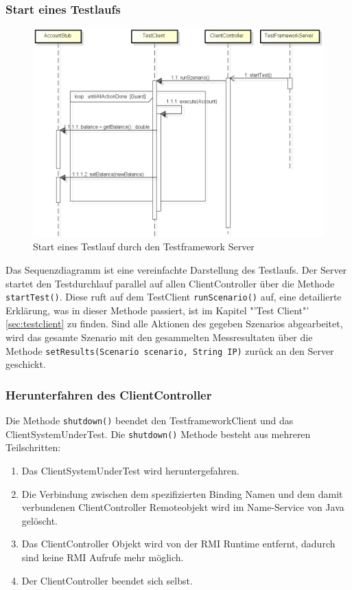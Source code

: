 \subsubsection{Start eines Testlaufs}
\begin{figure}[H]
\begin{center}
\includegraphics[scale=0.55]{image_testFramework/startTest.png}
\end{center}
\caption{Start eines Testlauf durch den Testframework Server}
\end{figure}
Das Sequenzdiagramm ist eine vereinfachte Darstellung des Testlaufs. Der Server startet den Testdurchlauf parallel auf allen ClientController über die Methode \verb+startTest()+. Diese ruft auf dem TestClient \verb+runScenario()+ auf, eine detailierte Erklärung, was in dieser Methode passiert, ist im Kapitel "'Test Client"' \ref{sec:testclient} zu finden. Sind alle Aktionen des gegeben Szenarios abgearbeitet, wird das gesamte Szenario mit den gesammelten Messresultaten über die Methode \verb+setResults(Scenario scenario, String IP)+ zurück an den Server geschickt.

\subsubsection{Herunterfahren des ClientController}
Die Methode \texttt{shutdown()} be\-endet den Test\-frame\-work\-Client und das Client\-System\-Under\-Test. Die \texttt{shut\allowbreak down()} Me\-tho\-de be\-steht aus mehreren Teil\-schrit\-ten:
\begin{enumerate}
\item Das ClientSystemUnderTest wird heruntergefahren.
\item Die Verbindung zwischen dem spezifizierten Binding Namen und dem damit verbundenen ClientController Remoteobjekt wird im Name-Service von Java gelöscht.
\item Das ClientController Objekt wird von der RMI Run\-time entfernt, da\-durch sind keine RMI Aufrufe mehr möglich.
\item Der ClientController beendet sich selbst.
\end{enumerate}

